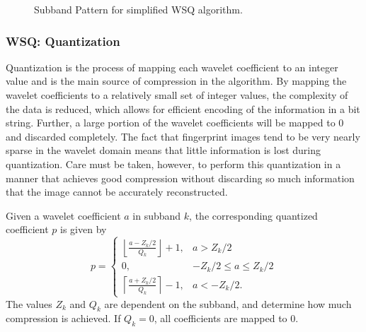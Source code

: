 \begin{figure}[H]
\begin{center}

\caption{Subband Pattern for simplified WSQ algorithm.}
\label{fig:wavelets-subbands}
\end{center}
\end{figure}

\subsubsection*{WSQ: Quantization}
Quantization is the process of mapping each wavelet coefficient to an integer value and is the main source of compression in the algorithm.
By mapping the wavelet coefficients to a relatively small set of integer values, the complexity of the data is reduced, which allows for efficient encoding of the information in a bit string.
Further, a large portion of the wavelet coefficients will be mapped to 0 and discarded completely.
The fact that fingerprint images tend to be very nearly sparse in the wavelet domain means that little information is lost during quantization.
Care must be taken, however, to perform this quantization in a manner that achieves good compression without discarding so much information that the image cannot be accurately reconstructed.

Given a wavelet coefficient $a$ in subband $k$, the corresponding quantized coefficient $p$ is given by
\[
p =
\begin{cases}
   \left\lfloor\frac{a-Z_k/2}{Q_k}\right\rfloor + 1, & a> Z_k/2 \\
   0,       & -Z_k/2 \leq a \leq Z_k/2\\
   \left\lceil\frac{a + Z_k/2}{Q_k}\right\rceil - 1, & a < -Z_k/2.
  \end{cases}
\]
The values $Z_k$ and $Q_k$ are dependent on the subband, and determine how much compression is achieved.
If $Q_k=0$, all coefficients are mapped to 0.

